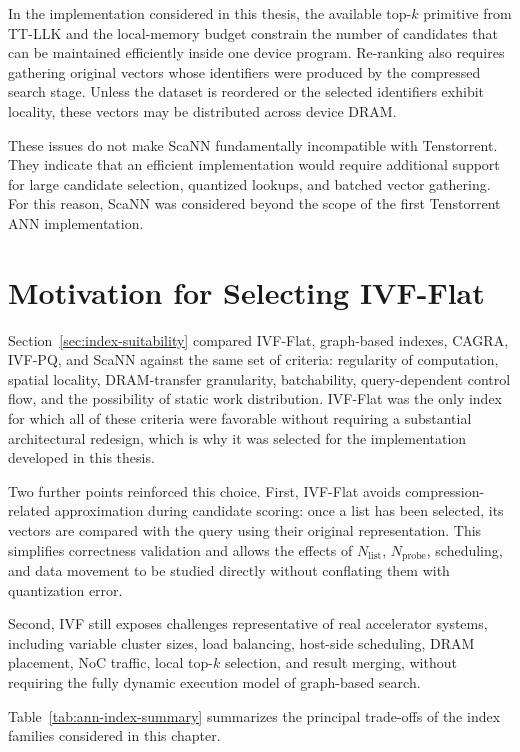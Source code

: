 In the implementation considered in this thesis, the available top-\(k\) primitive from TT-LLK and the local-memory budget constrain the number of candidates that can be maintained efficiently inside one device program. Re-ranking also requires gathering original vectors whose identifiers were produced by the compressed search stage. Unless the dataset is reordered or the selected identifiers exhibit locality, these vectors may be distributed across device DRAM.

These issues do not make ScaNN fundamentally incompatible with Tenstorrent. They indicate that an efficient implementation would require additional support for large candidate selection, quantized lookups, and batched vector gathering. For this reason, ScaNN was considered beyond the scope of the first Tenstorrent ANN implementation.

\section{Motivation for Selecting IVF-Flat}
\label{sec:ivf-flat-selection}

Section~\ref{sec:index-suitability} compared IVF-Flat, graph-based indexes, CAGRA, IVF-PQ, and ScaNN against the same set of criteria: regularity of computation, spatial locality, DRAM-transfer granularity, batchability, query-dependent control flow, and the possibility of static work distribution. IVF-Flat was the only index for which all of these criteria were favorable without requiring a substantial architectural redesign, which is why it was selected for the implementation developed in this thesis.

Two further points reinforced this choice. First, IVF-Flat avoids compression-related approximation during candidate scoring: once a list has been selected, its vectors are compared with the query using their original representation. This simplifies correctness validation and allows the effects of \(N_{\mathrm{list}}\), \(N_{\mathrm{probe}}\), scheduling, and data movement to be studied directly without conflating them with quantization error.

Second, IVF still exposes challenges representative of real accelerator systems, including variable cluster sizes, load balancing, host-side scheduling, DRAM placement, NoC traffic, local top-\(k\) selection, and result merging, without requiring the fully dynamic execution model of graph-based search.

Table~\ref{tab:ann-index-summary} summarizes the principal trade-offs of the index families considered in this chapter.

